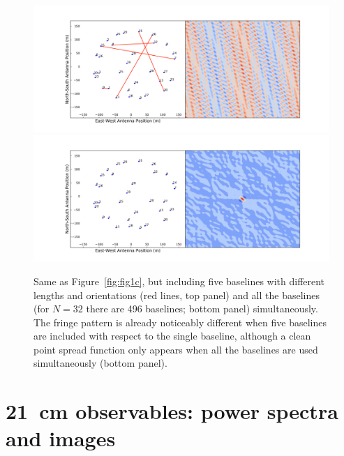 %
\begin{figure}[]
\begin{center}
\includegraphics[width=1.\textwidth]{Bernardi/fringe_5bls}
\includegraphics[width=1.\textwidth]{Bernardi/fringe_bl_all}
\end{center}
\caption{Same as Figure~\ref{fig:fig1c}, but including five baselines with different lengths and orientations (red lines, top panel) and all the baselines (for $N = 32$ there are 496 baselines; bottom panel) simultaneously. The fringe pattern is already noticeably different when five baselines are included with respect to the single baseline, although a clean point spread function only appears when all the baselines are used simultaneously (bottom panel).}
\label{fig:fig1d}
\end{figure}





\section{21~cm observables: power spectra and images}
\label{sec:observables}

